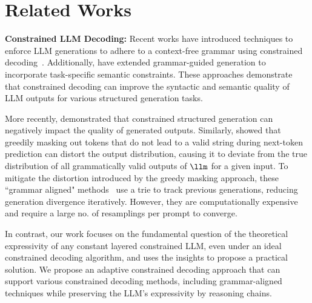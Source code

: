 \section{Related Works}
\textbf{Constrained LLM Decoding:}
Recent works have introduced techniques to enforce LLM generations to adhere to a context-free grammar using constrained decoding~\cite{ugare2024syncodellmgenerationgrammar, willard2023efficient, beurerkellner2024guiding, melcer2024constraineddecodingfillinthemiddlecode}.
Additionally, \citet{poesia2022synchromesh, ugare2024itergeniterativestructuredllm} have extended grammar-guided generation to incorporate task-specific semantic constraints. 
These approaches demonstrate that constrained decoding can improve the syntactic and semantic quality of LLM outputs for various structured generation tasks.

More recently, \citet{speakFree} demonstrated that constrained structured generation can negatively impact the quality of generated outputs. Similarly, \citet{park2024grammaraligneddecoding} showed that greedily masking out tokens that do not lead to a valid string during next-token prediction can distort the output distribution, causing it to deviate from the true distribution of all grammatically valid outputs of $\llm$ for a given input.
To mitigate the distortion introduced by the greedy masking approach, these ``grammar aligned" methods~\cite{park2024grammaraligneddecoding, melcer2024approximatelyaligneddecoding} use a trie to track previous generations, reducing generation divergence iteratively. 
However, they are computationally expensive and require a large no. of resamplings per prompt to converge.

In contrast, our work focuses on the fundamental question of the theoretical expressivity of any constant layered constrained LLM, even under an ideal constrained decoding algorithm, and uses the insights to propose a practical solution.
We propose an adaptive constrained decoding approach that can support various constrained decoding methods, including grammar-aligned techniques while preserving the LLM's expressivity by reasoning chains.


